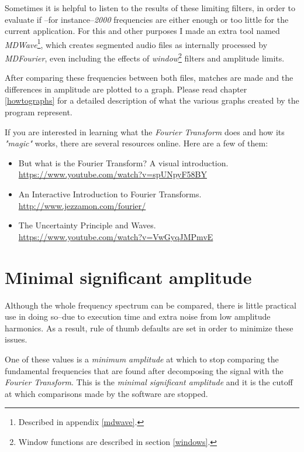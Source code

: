 \documentclass[10pt,a4paper]{report}
\begin{document}
Sometimes it is helpful to listen to the results of these limiting filters, in order to evaluate if --for instance--\textit{2000} frequencies are either enough or too little for the current application. For this and other purposes I made an extra tool named \textit{MDWave}\footnote{Described in appendix \ref{mdwave}.}, which creates segmented audio files as internally processed by \textit{MDFourier}, even including the effects of \textit{window}\footnote{Window functions are described in section \ref{windows}.} filters and amplitude limits.

After comparing these frequencies between both files, matches are made and the differences in amplitude are plotted to a graph. Please read chapter \ref{howtographs} for a detailed description of what the various graphs created by the program represent.

If you are interested in learning what the \textit{Fourier Transform} does and how its \textit{"magic"} works, there are several resources online. Here are a few of them:

\begin{itemize}
	\item But what is the Fourier Transform? A visual introduction.\\ \url{https://www.youtube.com/watch?v=spUNpyF58BY}
	\item An Interactive Introduction to Fourier Transforms.\\ \url{http://www.jezzamon.com/fourier/}
	\item The Uncertainty Principle and Waves.\\ \url{https://www.youtube.com/watch?v=VwGyqJMPmvE}
\end{itemize}

\section{Minimal significant amplitude}
\label{MinSigAmplitude}

Although the whole frequency spectrum can be compared, there is little practical use in doing so--due to execution time and extra noise from low amplitude harmonics. As a result, rule of thumb defaults are set in order to minimize these issues.

One of these values is a \textit{minimum amplitude} at which to stop comparing the fundamental frequencies that are found after decomposing the signal with the \textit{Fourier Transform}. This is the \textit{minimal significant amplitude} and it is the cutoff at which comparisons made by the software are stopped.
\end{document}
